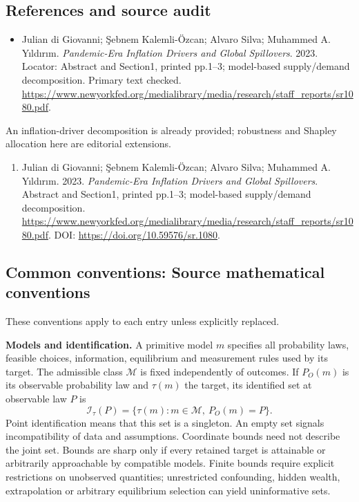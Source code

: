 \documentclass[11pt,a4paper]{article}
\begin{document}
\subsection*{References and source audit}
\begin{itemize}
\item Julian di Giovanni; \c{S}ebnem Kalemli-\"{O}zcan; Alvaro Silva; Muhammed A. Y\i{}ld\i{}r\i{}m. \emph{Pandemic-Era Inflation Drivers and Global Spillovers}. 2023. Locator: Abstract and Section1, printed pp.1--3; model-based supply/demand decomposition. Primary text checked. \url{https://www.newyorkfed.org/medialibrary/media/research/staff_reports/sr1080.pdf}.
\end{itemize}
An inflation-driver decomposition is already provided; robustness and Shapley allocation here are editorial extensions.
\begin{enumerate}\raggedright
\item\hypertarget{definitions:source:30007522:1}{} Julian di Giovanni; \c{S}ebnem Kalemli-\"{O}zcan; Alvaro Silva; Muhammed A. Y\i{}ld\i{}r\i{}m. 2023. \emph{Pandemic-Era Inflation Drivers and Global Spillovers}. Abstract and Section1, printed pp.1--3; model-based supply/demand decomposition.
\url{https://www.newyorkfed.org/medialibrary/media/research/staff_reports/sr1080.pdf}.
DOI: \url{https://doi.org/10.59576/sr.1080}.
\end{enumerate}

\subsection*{Common conventions: Source mathematical conventions}

These conventions apply to each entry unless explicitly replaced.

\textbf{Models and identification.} A primitive model \(m\) specifies all probability laws, feasible choices, information, equilibrium and measurement rules used by its target. The admissible class \(\mathcal M\) is fixed independently of outcomes. If \(P_O(m)\) is its observable probability law and \(\tau(m)\) the target, its identified set at observable law \(P\) is
\[
 \mathcal I_\tau(P)=\{\tau(m):m\in\mathcal M,\ P_O(m)=P\}.
\]
Point identification means that this set is a singleton. An empty set signals incompatibility of data and assumptions. Coordinate bounds need not describe the joint set. Bounds are sharp only if every retained target is attainable or arbitrarily approachable by compatible models. Finite bounds require explicit restrictions on unobserved quantities; unrestricted confounding, hidden wealth, extrapolation or arbitrary equilibrium selection can yield uninformative sets.
\end{document}
